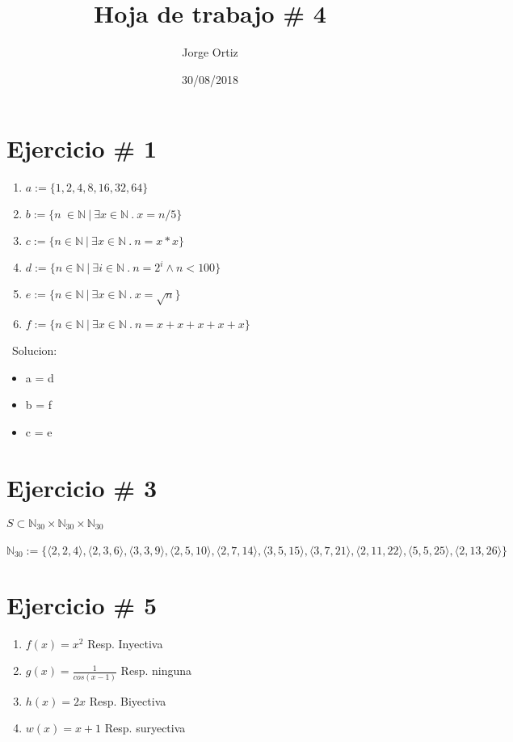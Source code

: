 \documentclass[10pt,a4paper]{article}
\date{30/08/2018}
\author{Jorge Ortiz}
\title{Hoja de trabajo \# 4}
\begin{document}
\maketitle

\section{Ejercicio \# 1}
\begin{enumerate}
        \item{$a:=\{1,2,4,8,16,32,64\}$}
        \item{$b:=\{n\ \in \mathbb{N}\ |\ \exists x \in \mathbb{N}\ .\ x=n/5 \}$}
        \item{$c:=\{n\in \mathbb{N}\ |\ \exists x\in\mathbb{N}\ .\ n=x*x \}$}
        \item{$d:=\{n\in\mathbb{N}\ |\ \exists i\in\mathbb{N}\ .\ n=2^i\wedge n<100 \}$}
        \item{$e:=\{ n\in\mathbb{N}\ |\ \exists x\in \mathbb{N}\ .\ x=\sqrt{n} \}$}
        \item{$f:=\{ n\in\mathbb{N}\ |\ \exists x\in \mathbb{N}\ .\ n=x+x+x+x+x \}$}
\end{enumerate}
\ Solucion:
\begin{itemize}

\item a = d
\item b = f
\item c = e
 

\end{itemize}

\section{Ejercicio \# 3}

$S\subset \mathbb{N}_{30}\times\mathbb{N}_{30}\times\mathbb{N}_{30}$ 
\\\
\\  $\mathbb{N}_{30}:=\{ \langle 2,2,4 \rangle , \langle 2,3,6 \rangle, \langle 3,3,9 \rangle, \langle 2,5,10 \rangle, \langle 2,7,14 \rangle, \langle 3,5,15 \rangle, \langle 3,7,21 \rangle,\langle 2,11,22 \rangle, \langle 5,5,25 \rangle, \langle 2,13,26 \rangle   \}$


\section{Ejercicio \# 5}

\begin{enumerate}
        \item{$f(x)=x^2$} Resp. Inyectiva
        \item{$g(x)=\frac{1}{cos(x-1)}$} Resp. ninguna
        \item{$h(x)=2x$} Resp. Biyectiva
        \item{$w(x)=x+1$} Resp. suryectiva
\end{enumerate}
\end{document}
